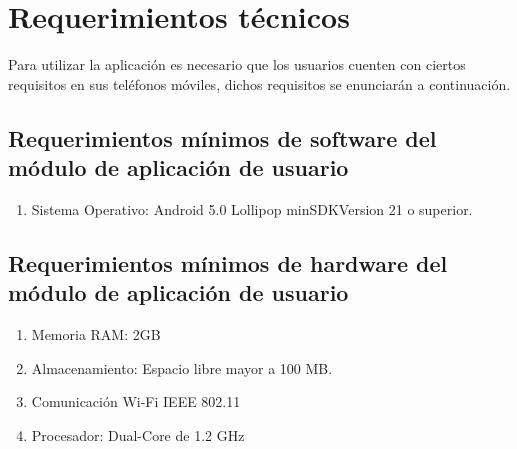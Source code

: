 \section{Requerimientos técnicos}
Para utilizar la aplicación es necesario que los usuarios cuenten con ciertos requisitos en sus teléfonos móviles, dichos requisitos se enunciarán a continuación.
\subsection{Requerimientos mínimos de software del módulo de aplicación de usuario}
\begin{enumerate}
	\item Sistema Operativo: Android 5.0 Lollipop minSDKVersion 21 o superior.
\end{enumerate}
\subsection{Requerimientos mínimos de hardware del módulo de aplicación de usuario}
\begin{enumerate}
	\item Memoria RAM: 2GB
	\item Almacenamiento: Espacio libre mayor a 100 MB.
	\item Comunicación Wi-Fi IEEE 802.11 
	\item Procesador: Dual-Core de 1.2 GHz
\end{enumerate}